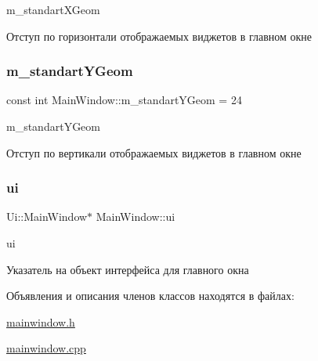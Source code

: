 m\+\_\+standart\+X\+Geom 

Отступ по горизонтали отображаемых виджетов в главном окне \mbox{\label{classMainWindow_a8ff8787bb09d87248d74e152d2133926}} 
\subsubsection{\texorpdfstring{m\+\_\+standart\+Y\+Geom}{m\_standartYGeom}}
{\footnotesize\ttfamily const int Main\+Window\+::m\+\_\+standart\+Y\+Geom = 24\hspace{0.3cm}{\ttfamily [private]}}



m\+\_\+standart\+Y\+Geom 

Отступ по вертикали отображаемых виджетов в главном окне \mbox{\label{classMainWindow_a35466a70ed47252a0191168126a352a5}} 
\subsubsection{\texorpdfstring{ui}{ui}}
{\footnotesize\ttfamily Ui\+::\+Main\+Window$\ast$ Main\+Window\+::ui\hspace{0.3cm}{\ttfamily [private]}}



ui 

Указатель на объект интерфейса для главного окна 

Объявления и описания членов классов находятся в файлах\+:\begin{DoxyCompactItemize}
\item 
\hyperlink{mainwindow_8h}{mainwindow.\+h}\item 
\hyperlink{mainwindow_8cpp}{mainwindow.\+cpp}\end{DoxyCompactItemize}
